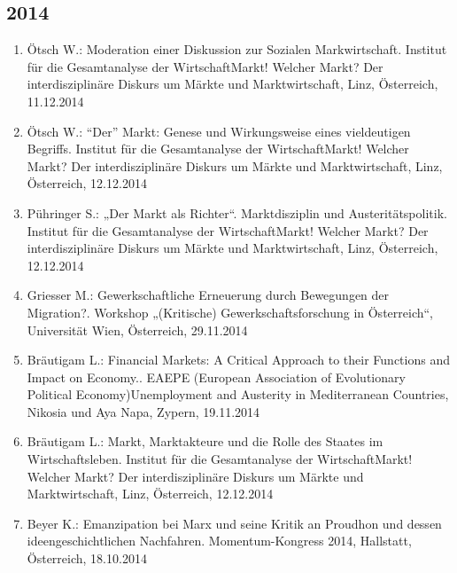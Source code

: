 \subsection*{2014}

\begin{enumerate}
	\item Ötsch W.: Moderation einer Diskussion zur Sozialen Markwirtschaft. Institut für die Gesamtanalyse der WirtschaftMarkt! Welcher Markt? Der interdisziplinäre Diskurs um Märkte und Marktwirtschaft, Linz, Österreich, 11.12.2014
	\item Ötsch W.: “Der” Markt: Genese und Wirkungsweise eines vieldeutigen Begriffs. Institut für die Gesamtanalyse der WirtschaftMarkt! Welcher Markt? Der interdisziplinäre Diskurs um Märkte und Marktwirtschaft, Linz, Österreich, 12.12.2014
	\item Pühringer S.: „Der Markt als Richter“. Marktdisziplin und Austeritätspolitik. Institut für die Gesamtanalyse der WirtschaftMarkt! Welcher Markt? Der interdisziplinäre Diskurs um Märkte und Marktwirtschaft, Linz, Österreich, 12.12.2014
	\item Griesser M.: Gewerkschaftliche Erneuerung durch Bewegungen der Migration?. Workshop „(Kritische) Gewerkschaftsforschung in Österreich“, Universität Wien, Österreich, 29.11.2014
	\item Bräutigam L.: Financial Markets: A Critical Approach to their Functions and Impact on Economy.. EAEPE (European Association of Evolutionary Political Economy)Unemployment and Austerity in Mediterranean Countries, Nikosia und Aya Napa, Zypern, 19.11.2014
	\item Bräutigam L.: Markt, Marktakteure und die Rolle des Staates im Wirtschaftsleben. Institut für die Gesamtanalyse der WirtschaftMarkt! Welcher Markt? Der interdisziplinäre Diskurs um Märkte und Marktwirtschaft, Linz, Österreich, 12.12.2014
	\item Beyer K.: Emanzipation bei Marx und seine Kritik an Proudhon und dessen ideengeschichtlichen Nachfahren. Momentum-Kongress 2014, Hallstatt, Österreich, 18.10.2014
\end{enumerate}

